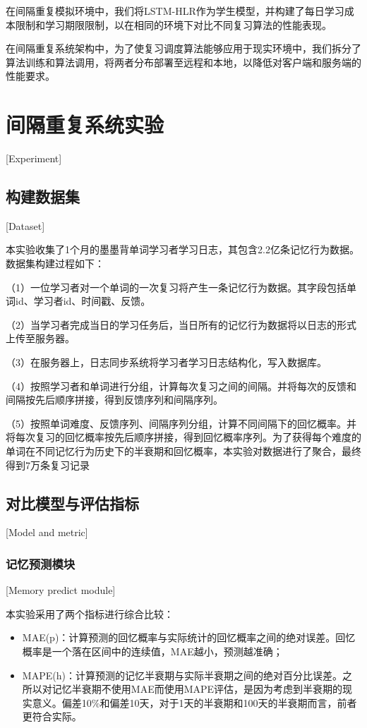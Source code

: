 在间隔重复模拟环境中，我们将LSTM-HLR作为学生模型，并构建了每日学习成本限制和学习期限限制，以在相同的环境下对比不同复习算法的性能表现。

在间隔重复系统架构中，为了使复习调度算法能够应用于现实环境中，我们拆分了算法训练和算法调用，将两者分布部署至远程和本地，以降低对客户端和服务端的性能要求。

\chapter{间隔重复系统实验}[Experiment]

\section{构建数据集}[Dataset]

本实验收集了1个月的墨墨背单词学习者学习日志，其包含2.2亿条记忆行为数据。数据集构建过程如下：

（1）一位学习者对一个单词的一次复习将产生一条记忆行为数据。其字段包括单词id、学习者id、时间戳、反馈。

（2）当学习者完成当日的学习任务后，当日所有的记忆行为数据将以日志的形式上传至服务器。

（3）在服务器上，日志同步系统将学习者学习日志结构化，写入数据库。

（4）按照学习者和单词进行分组，计算每次复习之间的间隔。并将每次的反馈和间隔按先后顺序拼接，得到反馈序列和间隔序列。

（5）按照单词难度、反馈序列、间隔序列分组，计算不同间隔下的回忆概率。并将每次复习的回忆概率按先后顺序拼接，得到回忆概率序列。为了获得每个难度的单词在不同记忆行为历史下的半衰期和回忆概率，本实验对数据进行了聚合，最终得到7万条复习记录

\section{对比模型与评估指标}[Model and metric]

\subsection{记忆预测模块}[Memory predict module]

本实验采用了两个指标进行综合比较：

\begin{itemize}
    \item MAE(p)：计算预测的回忆概率与实际统计的回忆概率之间的绝对误差。回忆概率是一个落在区间中的连续值，MAE越小，预测越准确；
    \item MAPE(h)：计算预测的记忆半衰期与实际半衰期之间的绝对百分比误差。之所以对记忆半衰期不使用MAE而使用MAPE评估，是因为考虑到半衰期的现实意义。偏差10\%和偏差10天，对于1天的半衰期和100天的半衰期而言，前者更符合实际。
\end{itemize}

